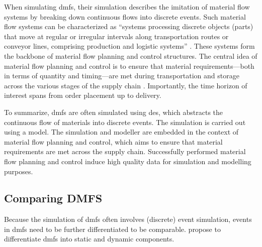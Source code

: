 When simulating \gls{dmfs}, their simulation describes the imitation of material flow systems by breaking down continuous flows into discrete events. Such material flow systems can be characterized as “systems processing discrete objects (parts) that move at regular or irregular intervals along transportation routes or conveyor lines, comprising production and logistic systems” \autocite{Arnold2006,schwede2024learning}. These systems form the backbone of material flow planning and control structures. The central idea of material flow planning and control is to ensure that material requirements—both in terms of quantity and timing—are met during transportation and storage across the various stages of the supply chain \autocite{Gehr2007}. Importantly, the time horizon of interest spans from order placement up to delivery.

To summarize, \gls{dmfs} are often simulated using \gls{des}, which abstracts the continuous flow of materials into discrete events. The simulation is carried out using a model. The simulation and modeller are embedded in the context of material flow planning and control, which aims to ensure that material requirements are met across the supply chain. Successfully performed material flow planning and control induce high quality data for simulation and modelling purposes.

\subsection{Comparing DMFS}
\label{sec:comparing-dmfs}
Because the simulation of \gls{dmfs} often involves (discrete) event simulation, events in \gls{dmfs} need to be further differentiated to be comparable. \Textcite{Arnold2006} propose to differentiate \gls{dmfs} into static and dynamic components.

